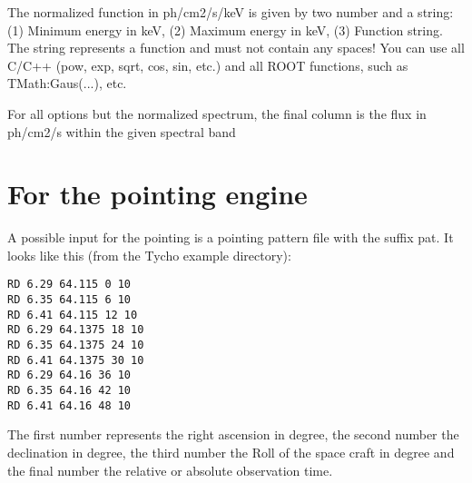 The normalized function in ph/cm2/s/keV is given by two number and a string: (1) Minimum energy in keV, (2) Maximum energy in keV, (3) Function string.
The string represents a function and must not contain any spaces!
You can use all C/C++ (pow, exp, sqrt, cos, sin, etc.) and all ROOT functions, such as TMath:Gaus(...), etc.


For all options but the normalized spectrum, the final column is the flux in ph/cm2/s within the given spectral band



\section{For the pointing engine \label{inputformats:pointing}}

A possible input for the pointing is a pointing pattern file with the suffix pat.
It looks like this (from the Tycho example directory):
\begin{verbatim}
RD 6.29 64.115 0 10
RD 6.35 64.115 6 10
RD 6.41 64.115 12 10
RD 6.29 64.1375 18 10
RD 6.35 64.1375 24 10
RD 6.41 64.1375 30 10
RD 6.29 64.16 36 10
RD 6.35 64.16 42 10
RD 6.41 64.16 48 10
\end{verbatim}

The first number represents the right ascension in degree, the second number the declination in degree, the third number the Roll of the space craft in degree and the final number the relative or absolute observation time.